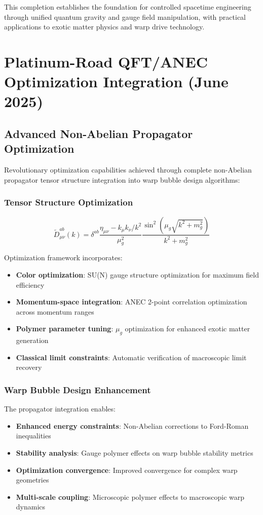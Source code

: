 \documentclass[11pt]{article}
\begin{document}
This completion establishes the foundation for controlled spacetime engineering through unified quantum gravity and gauge field manipulation, with practical applications to exotic matter physics and warp drive technology.

\section{Platinum-Road QFT/ANEC Optimization Integration (June 2025)}

\subsection{Advanced Non-Abelian Propagator Optimization}

Revolutionary optimization capabilities achieved through complete non-Abelian propagator tensor structure integration into warp bubble design algorithms:

\subsubsection{Tensor Structure Optimization}
\begin{equation}
\tilde{D}^{ab}_{\mu\nu}(k) = \delta^{ab} \frac{\eta_{\mu\nu} - k_\mu k_\nu/k^2}{\mu_g^2} \frac{\sin^2(\mu_g\sqrt{k^2 + m_g^2})}{k^2 + m_g^2}
\end{equation}

Optimization framework incorporates:
\begin{itemize}
    \item \textbf{Color optimization}: SU(N) gauge structure optimization for maximum field efficiency
    \item \textbf{Momentum-space integration}: ANEC 2-point correlation optimization across momentum ranges  
    \item \textbf{Polymer parameter tuning}: $\mu_g$ optimization for enhanced exotic matter generation
    \item \textbf{Classical limit constraints}: Automatic verification of macroscopic limit recovery
\end{itemize}

\subsubsection{Warp Bubble Design Enhancement}
The propagator integration enables:
\begin{itemize}
    \item \textbf{Enhanced energy constraints}: Non-Abelian corrections to Ford-Roman inequalities
    \item \textbf{Stability analysis}: Gauge polymer effects on warp bubble stability metrics
    \item \textbf{Optimization convergence}: Improved convergence for complex warp geometries
    \item \textbf{Multi-scale coupling}: Microscopic polymer effects to macroscopic warp dynamics
\end{itemize}
\end{document}
